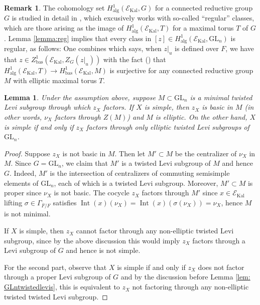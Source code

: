 \documentclass[11pt]{amsart}
\newtheorem{lem}[thm]{Lemma}
\theoremstyle{definition}
\newtheorem{rem}[thm]{Remark}
\newcommand{\mc}{\mathcal}
\newcommand{\ov}{\overline}
\newcommand{\GL}{\mathrm{GL}}
\DeclareMathOperator{\Kal}{Kal}
\DeclareMathOperator{\Int}{Int}
\DeclareMathOperator{\bas}{bas}
\begin{document}
\begin{rem}
    The cohomology set $H_{\text{alg}}^{1}(\mc{E}_{\Kal}, G)$ for a connected reductive group $G$ is studied in detail in \cite{DS24}, which excusively works with so-called ``regular'' classes, which are those arising as the image of $H^{1}_{\text{alg}}(\mc{E}_{\Kal}, T)$ for a maximal torus $T$ of $G$. Lemma \ref{lemma:reg} implies that every class in $[z] \in H_{\text{alg}}^{1}(\mc{E}_{\Kal}, \GL_{n})$ is regular, as follows: One combines \cite[Lemma 2.8]{DS24} which says, when $z|_{u}$ is defined over $F$, we have that $z \in Z_{\bas}^{1}(\mc{E}_{\Kal}, Z_{G}(z|_{u}))$ with the fact (\cite[Corollary 3.7]{Kalannals}) that $H_{\text{alg}}^{1}(\mc{E}_{\Kal}, T) \to H_{\bas}^{1}(\mc{E}_{\Kal}, M)$ is surjective for any connected reductive group $M$ with elliptic maximal torus $T$.
\end{rem}

\begin{lem}\label{lem:simple}
Under the assumption above, suppose $M \subset \GL_n$ is a minimal twisted Levi subgroup through which $z_X$ factors. If $X$ is simple, then $z_X$ is basic in $M$ (in other words, $\nu_X$ factors through $Z(M)$) and $M$ is elliptic. On the other hand, $X$ is simple if and only if $z_X$ factors through only elliptic twisted Levi subgroups of $\GL_{n}$.
\end{lem}
\begin{proof}
Suppose $z_X$ is not basic in $M$. Then let $M' \subset M$ be the centralizer of $\nu_X$ in $M$. Since $G=\GL_n$, we claim that $M'$ is a twisted Levi subgroup of $M$ and hence $G$. Indeed, $M'$ is the intersection of centralizers of commuting semisimple elements of $\GL_n$, each of which is a twisted Levi subgroup. Moreover, $M' \subset M$ is proper since $\nu_X$ is not basic. The cocycle $z_X$ factors through $M'$ since $x \in \mc{E}_{\Kal}$ lifting $\sigma \in \Gamma_{\ov{F}/F}$ satisfies $\Int(x)(\nu_X) = \Int(x)(\sigma(\nu_X))=\nu_X$, hence $M$ is not minimal. 

If $X$ is simple, then $z_X$ cannot factor through any non-elliptic twisted Levi subgroup, since by the above discussion this would imply $z_X$ factors through a Levi subgroup of $G$ and hence is not simple.

For the second part, observe that $X$ is simple if and only if $z_X$ does not factor through a proper Levi subgroup of $G$ and by the discussion before Lemma \ref{lem: GLntwistedlevis}, this is equivalent to $z_X$ not factoring through any non-elliptic twisted twisted Levi subgroup. 
\end{proof}
\end{document}
